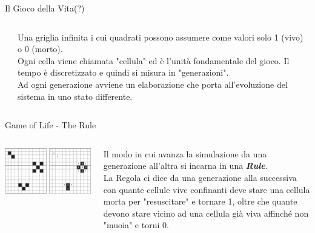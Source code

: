 \documentclass[11pt]{beamer}
\begin{document}
\begin{frame}[fragile]{Il Gioco della Vita(?)}
\pause
	\begin{columns}[T] %
		\begin{column}{.48\textwidth}
			\transduration<0-29>{0}
		\end{column}%
		\hfill%
		\begin{column}{.48\textwidth}
			\pause
			Una griglia infinita i cui quadrati possono assumere come valori solo 1 (vivo) o 0 (morto).\\
			Ogni cella viene chiamata "cellula" ed è l'unità fondamentale del gioco. Il tempo è discretizzato e quindi si misura in "generazioni".\\
			Ad ogni generazione avviene un elaborazione che porta all'evoluzione del sistema in uno stato differente.
		\end{column}%
	\end{columns}
\end{frame}
\begin{frame}{Game of Life - The Rule}
\begin{columns}[T] %
	\begin{column}{.48\textwidth}
		\includegraphics[width=\linewidth]{ExampleRule.png}
	\end{column}%
	\hfill%
	\begin{column}{.48\textwidth}
		Il modo in cui avanza la simulazione da una generazione all'altra si incarna in una \textit{\textbf{Rule}}.\\
		La Regola ci dice da una generazione alla successiva con quante cellule vive confinanti deve stare una cellula morta per "resuscitare" e tornare 1, oltre che quante devono stare vicino ad una cellula già viva affinché non "muoia" e torni 0.
	\end{column}%
\end{columns}
\end{frame}
\end{document}
